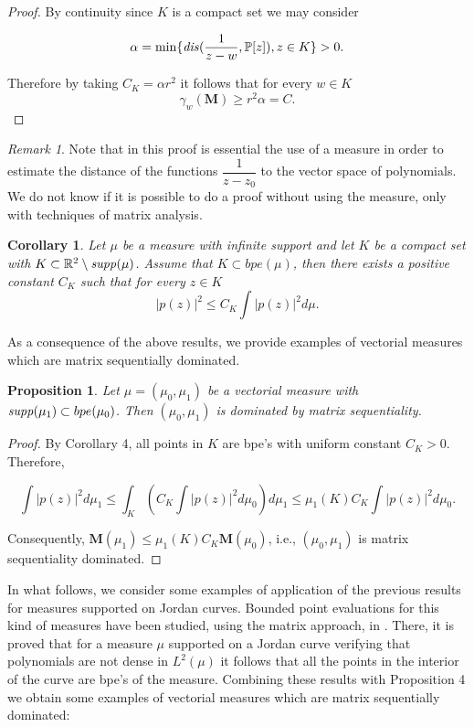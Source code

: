\documentclass[12pt]{amsart}
\theoremstyle{definition}
\theoremstyle{plain}
\newtheorem{corollary}{Corollary}
\newtheorem{prop}{Proposition}
\theoremstyle{remark}
\newtheorem{remark}{Remark}
\begin{document}
\begin{proof}
\noindent By continuity since  $K$ is a compact set we may consider 
 
$$
\alpha  = \min \{ {\it dis}(\dfrac{1}{z-w}, \mathbb{P}[z]), z\in K\} >0.
$$

\noindent Therefore by taking $C_{K}=\alpha r^{2}$ it  follows that for every $w\in K$ 
$$
\gamma_{w}(\mathbf{M}) \geq r^{2}\alpha =C.
$$
\end{proof} 



\begin{remark} Note that in this proof is essential the use of a measure in order to estimate the distance of the functions $\dfrac{1}{z-z_0}$ to the vector space of polynomials. We do not know if it is possible to do a proof  without using the measure, only with techniques of  matrix analysis. 
\end{remark}



\begin{corollary} Let $\mu$ be a measure with infinite support and let $K$ be a compact set with $K \subset \mathbb{R}^{2}\setminus {\it supp}(\mu)$. Assume that $K \subset bpe(\mu)$,  then there exists a positive constant $C_{K}$ such that for every $z\in K$
$$
\vert p(z) \vert^{2} \leq C_K \int \vert p(z) \vert^{2} d\mu.
$$
\end{corollary}


\noindent As a consequence of the above results, we provide examples of vectorial measures which are matrix sequentially dominated.

\begin{prop} Let $\mu=(\mu_0,\mu_1)$ be a vectorial measure  with ${\it supp}(\mu_1) \subset bpe(\mu_0)$.
Then $(\mu_0,\mu_1)$ is dominated by matrix sequentiality. 
\end{prop}

\begin{proof} By  Corollary 4, all points in $K$ are bpe's with uniform constant $C_K>0$. Therefore, 

$$ 
\int  \vert p(z) \vert^{2} d\mu_1 \leq \int_{K} \left(C_{K} \int \vert p(z) \vert^{2} d\mu_0 \right)d\mu_1 \leq 
\mu_1(K) C_{K} \int \vert p(z) \vert^{2} d\mu_0 . 
$$

\noindent Consequently, $\mathbf{M}(\mu_1) \leq \mu_1(K) C_{K} \mathbf{M}(\mu_0)$, i.e.,  
 $(\mu_0,\mu_1)$ is matrix sequentiality  dominated.
\end{proof} 


\noindent In what follows, we consider some examples of application of the previous results for measures supported on Jordan curves. Bounded point evaluations for this kind of measures have been studied, using the matrix approach, in \cite{EGT5}. There, it is proved that for a measure $\mu$ supported on a Jordan curve verifying that polynomials are not dense in $L^{2}(\mu)$ it follows that all the points in the interior of the curve are bpe's of the measure. Combining these results with Proposition 4 we obtain some examples of vectorial measures which are matrix sequentially dominated: 
\end{document}
